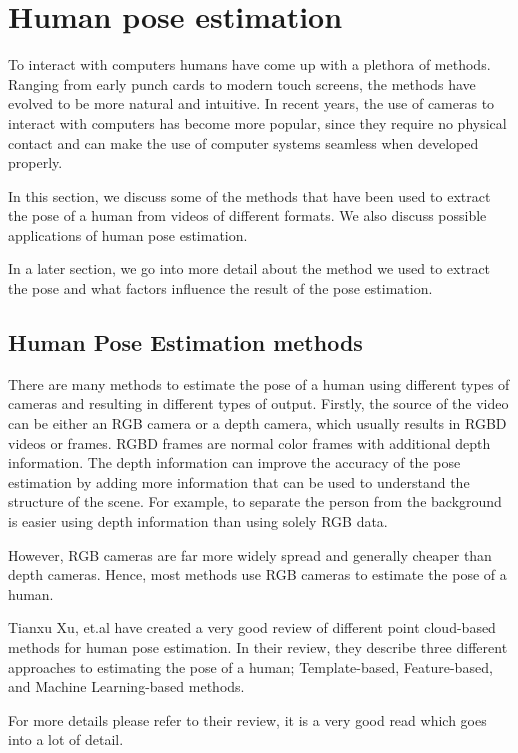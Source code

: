 \section{Human pose estimation}

To interact with computers humans have come up with a plethora of methods. Ranging from early punch cards to modern touch screens, the methods have evolved to be more natural and intuitive. In recent years, the use of cameras to interact with computers has become more popular, since they require no physical contact and can make the use of computer systems seamless when developed properly.

In this section, we discuss some of the methods that have been used to extract the pose of a human from videos of different formats. We also discuss possible applications of human pose estimation.

In a later section, we go into more detail about the method we used to extract the pose and what factors influence the result of the pose estimation. 

\subsection{Human Pose Estimation methods}

There are many methods to estimate the pose of a human using different types of cameras and resulting in different types of output. Firstly, the source of the video can be either an RGB camera or a depth camera, which usually results in RGBD videos or frames. RGBD frames are normal color frames with additional depth information. The depth information can improve the accuracy of the pose estimation by adding more information that can be used to understand the structure of the scene. For example, to separate the person from the background is easier using depth information than using solely RGB data.

However, RGB cameras are far more widely spread and generally cheaper than depth cameras. Hence, most methods use RGB cameras to estimate the pose of a human.

Tianxu Xu, et.al have created a very good review of different point cloud-based methods for human pose estimation\cite{hpeReview2021}. In their review, they describe three different approaches to estimating the pose of a human; Template-based, Feature-based, and Machine Learning-based methods.

For more details please refer to their review, it is a very good read which goes into a lot of detail.


